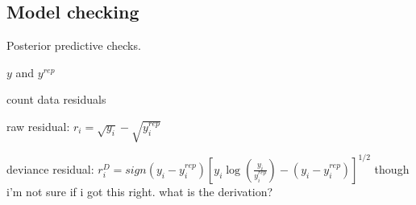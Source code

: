 \documentclass[12pt,letterpaper]{article}
\begin{document}


\subsection{Model checking}
Posterior predictive checks.

\(y\) and \(y^{rep}\)

count data residuals \citep{Gelman2007}

raw residual: \(r_{i} = \sqrt{y_{i}} - \sqrt{y_{i}^{rep}}\)

deviance residual: \(r_{i}^{D} = sign(y_{i} - y_{i}^{rep}) \left[y_{i} \log\left(\frac{y_{i}}{y_{i}^{rep}}\right) - (y_{i} - y_{i}^{rep})\right]^{1/2}\) though i'm not sure if i got this right. what is the derivation?
\end{document}

